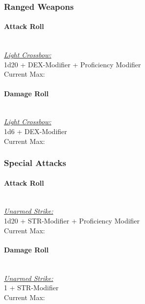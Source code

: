 \documentclass[letterpaper,openany,oneside,twocolumn]{book}
\begin{document}
\subsubsection*{Ranged Weapons}
\paragraph*{Attack Roll}\hfill\\
\underline{\textit{Light Crossbow:}}\\
1d20 + DEX-Modifier + Proficiency Modifier\\
\indent Current Max: 
\paragraph*{Damage Roll}\hfill\\
\underline{\textit{Light Crossbow:}}\\
1d6 + DEX-Modifier\\
\indent Current Max: 
\subsubsection*{Special Attacks}
\paragraph*{Attack Roll}\hfill\\
\underline{\textit{Unarmed Strike:}}\\
1d20 + STR-Modifier + Proficiency Modifier\\
\indent Current Max: 
\paragraph*{Damage Roll}\hfill\\
\underline{\textit{Unarmed Strike:}}\\
1 + STR-Modifier\\
\indent Current Max: 
\end{document}

